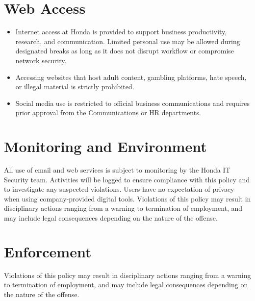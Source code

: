 \section{Web Access}

\begin{itemize}
    \item \textbf{}Internet access at Honda is provided to support business productivity, research, and communication. Limited personal use may be allowed during designated breaks as long as it does not disrupt workflow or compromise network security.

    \item \textbf{}Accessing websites that host adult content, gambling platforms, hate speech, or illegal material is strictly prohibited.

    \item \textbf{}Social media use is restricted to official business communications and requires prior approval from the Communications or HR departments.
    
\end{itemize}

\section{Monitoring and Environment}

All use of email and web services is subject to monitoring by the Honda IT Security team. Activities will be logged to ensure compliance with this policy and to investigate any suspected violations. Users have no expectation of privacy when using company-provided digital tools. Violations of this policy may result in disciplinary actions ranging from a warning to termination of employment, and may include legal consequences depending on the nature of the offense.

\section{Enforcement}
Violations of this policy may result in disciplinary actions ranging from a warning to termination of employment, and may include legal consequences depending on the nature of the offense.